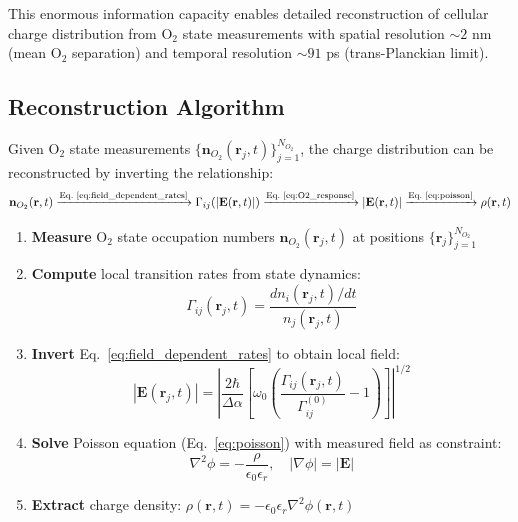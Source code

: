 \documentclass[twocolumn,10pt,aps,prd,superscriptaddress,floatfix,nofootinbib]{revtex4-2}
\theoremstyle{remark}
\begin{document}
This enormous information capacity enables detailed reconstruction of cellular charge distribution from O$_2$ state measurements with spatial resolution $\sim 2$ nm (mean O$_2$ separation) and temporal resolution $\sim 91$ ps (trans-Planckian limit).

\subsection{Reconstruction Algorithm}

Given O$_2$ state measurements $\{\mathbf{n}_{O_2}(\mathbf{r}_j, t)\}_{j=1}^{N_{O_2}}$, the charge distribution can be reconstructed by inverting the relationship:
\begin{equation}
\mathbf{n}_{O_2}(\mathbf{r}, t) \xrightarrow{\text{Eq.~\ref{eq:field_dependent_rates}}} \Gamma_{ij}(|\mathbf{E}(\mathbf{r}, t)|) \xrightarrow{\text{Eq.~\ref{eq:O2_response}}} |\mathbf{E}(\mathbf{r}, t)| \xrightarrow{\text{Eq.~\ref{eq:poisson}}} \rho(\mathbf{r}, t)
\end{equation}

\begin{algorithm}
\label{alg:reconstruction}
\begin{enumerate}
\item \textbf{Measure} O$_2$ state occupation numbers $\mathbf{n}_{O_2}(\mathbf{r}_j, t)$ at positions $\{\mathbf{r}_j\}_{j=1}^{N_{O_2}}$
\item \textbf{Compute} local transition rates from state dynamics:
\begin{equation}
\Gamma_{ij}(\mathbf{r}_j, t) = \frac{dn_i(\mathbf{r}_j, t)/dt}{n_j(\mathbf{r}_j, t)}
\end{equation}
\item \textbf{Invert} Eq.~\ref{eq:field_dependent_rates} to obtain local field:
\begin{equation}
|\mathbf{E}(\mathbf{r}_j, t)| = \left|\frac{2\hbar}{\Delta\alpha}\left[\omega_0\left(\frac{\Gamma_{ij}(\mathbf{r}_j, t)}{\Gamma_{ij}^{(0)}} - 1\right)\right]\right|^{1/2}
\end{equation}
\item \textbf{Solve} Poisson equation (Eq.~\ref{eq:poisson}) with measured field as constraint:
\begin{equation}
\nabla^2\phi = -\frac{\rho}{\epsilon_0\epsilon_r}, \quad |\nabla\phi| = |\mathbf{E}|
\end{equation}
\item \textbf{Extract} charge density: $\rho(\mathbf{r}, t) = -\epsilon_0\epsilon_r\nabla^2\phi(\mathbf{r}, t)$
\end{enumerate}
\end{algorithm}
\end{document}
